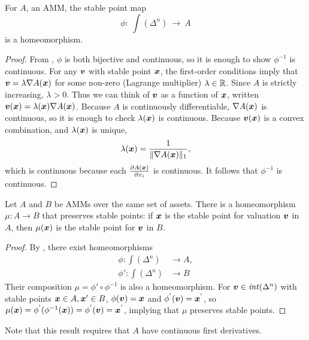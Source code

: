 \begin{lemma}
For $A$, an AMM,
the stable point map
\begin{equation*}
    \phi:~\int(\Delta^n)~\to~A
\end{equation*}
is a homeomorphism.
\end{lemma}

\begin{proof}
From , $\phi$ is both bijective and continuous,
so it is enough to show $\phi^{-1}$ is continuous.
For any ${\boldsymbol v}$ with stable point ${\boldsymbol x}$,
the first-order conditions imply that ${\boldsymbol v} = \lambda \nabla A({\boldsymbol x})$
for some non-zero (Lagrange multiplier) $\lambda \in \mathbb{R}$.
Since $A$ is strictly increasing, $\lambda > 0$.
Thus we can think of ${\boldsymbol v}$ as a function of ${\boldsymbol x}$,
written ${\boldsymbol v}({\boldsymbol x}) = \lambda({\boldsymbol x}) \nabla A({\boldsymbol x})$.
Because $A$ is continuously differentiable, $\nabla A({\boldsymbol x})$ is continuous,
so it is enough to check $\lambda({\boldsymbol x})$ is continuous.
Because ${\boldsymbol v}({\boldsymbol x})$ is a convex combination, and $\lambda({\boldsymbol x})$ is unique,
\begin{equation*}
\lambda({\boldsymbol x}) = \frac{1}{\|\nabla A({\boldsymbol x})\|_1},
\end{equation*}
which is continuous because each $\frac{\partial A({\boldsymbol x})}{\partial x_i}$ is continuous.
It follows that $\phi^{-1}$ is continuous.
\end{proof}

\begin{theorem}
Let $A$ and $B$ be AMMs over the same set of assets.
There is a homeomorphism $\mu: A \to B$
that preserves stable points:
if ${\boldsymbol x}$ is the stable point for valuation ${\boldsymbol v}$ in $A$,
then $\mu({\boldsymbol x})$ is the stable point for ${\boldsymbol v}$ in $B$.
\end{theorem}

\begin{proof}
  By ,
  there exist homeomorphisms
  \begin{align*}
  \phi: \int(\Delta^n) &\rightarrow A,\\
  \phi': \int(\Delta^n) & \rightarrow B
  \end{align*}
  Their composition $\mu = \phi' \circ \phi^{-1}$ is also a homeomorphism.
  For ${\boldsymbol v} \in \mathit{int}(\Delta^n)$ with stable points ${\boldsymbol x} \in A, {\boldsymbol x}' \in B$,
  $\phi({\boldsymbol v}) = {\boldsymbol x}$ and $\phi^{'}({\boldsymbol v}) = {\boldsymbol x}^{'}$,
  so $\mu({\boldsymbol x}) = \phi^{'}(\phi^{-1}({\boldsymbol x})) = \phi^{'}({\boldsymbol v}) = {\boldsymbol x}^{'}$,
  implying that $\mu$ preserves stable points.
\end{proof}
Note that this result requires that $A$ have continuous first derivatives.